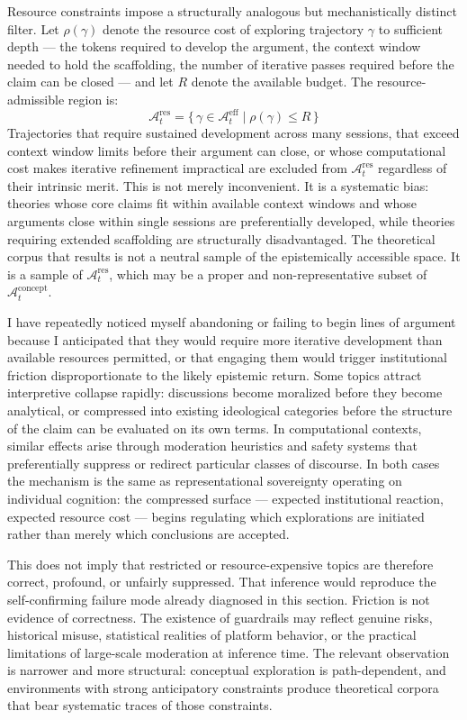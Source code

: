 \documentclass[12pt, a4paper]{article}
\begin{document}
Resource constraints impose a structurally analogous but mechanistically distinct filter. Let $\rho(\gamma)$ denote the resource cost of exploring trajectory $\gamma$ to sufficient depth --- the tokens required to develop the argument, the context window needed to hold the scaffolding, the number of iterative passes required before the claim can be closed --- and let $R$ denote the available budget. The resource-admissible region is:
\[
\mathcal{A}_t^{\mathrm{res}}
= \bigl\{\,\gamma \in \mathcal{A}_t^{\mathrm{eff}} \;\big|\; \rho(\gamma) \leq R\,\bigr\}
\]
Trajectories that require sustained development across many sessions, that exceed context window limits before their argument can close, or whose computational cost makes iterative refinement impractical are excluded from $\mathcal{A}_t^{\mathrm{res}}$ regardless of their intrinsic merit. This is not merely inconvenient. It is a systematic bias: theories whose core claims fit within available context windows and whose arguments close within single sessions are preferentially developed, while theories requiring extended scaffolding are structurally disadvantaged. The theoretical corpus that results is not a neutral sample of the epistemically accessible space. It is a sample of $\mathcal{A}_t^{\mathrm{res}}$, which may be a proper and non-representative subset of $\mathcal{A}_t^{\mathrm{concept}}$.

I have repeatedly noticed myself abandoning or failing to begin lines of argument because I anticipated that they would require more iterative development than available resources permitted, or that engaging them would trigger institutional friction disproportionate to the likely epistemic return. Some topics attract interpretive collapse rapidly: discussions become moralized before they become analytical, or compressed into existing ideological categories before the structure of the claim can be evaluated on its own terms. In computational contexts, similar effects arise through moderation heuristics and safety systems that preferentially suppress or redirect particular classes of discourse. In both cases the mechanism is the same as representational sovereignty operating on individual cognition: the compressed surface --- expected institutional reaction, expected resource cost --- begins regulating which explorations are initiated rather than merely which conclusions are accepted.

This does not imply that restricted or resource-expensive topics are therefore correct, profound, or unfairly suppressed. That inference would reproduce the self-confirming failure mode already diagnosed in this section. Friction is not evidence of correctness. The existence of guardrails may reflect genuine risks, historical misuse, statistical realities of platform behavior, or the practical limitations of large-scale moderation at inference time. The relevant observation is narrower and more structural: conceptual exploration is path-dependent, and environments with strong anticipatory constraints produce theoretical corpora that bear systematic traces of those constraints.
\end{document}
